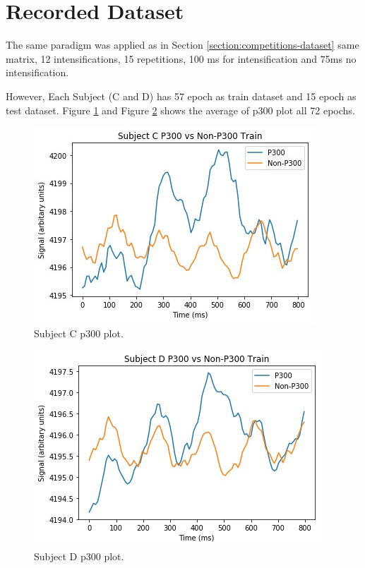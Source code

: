\section{Recorded Dataset}
The same paradigm was applied as in Section \ref{section:competitions-dataset} same matrix, 12 intensifications, 15 repetitions, 100 ms for intensification and 75ms no intensification.\par
However, Each Subject (C and D) has 57 epoch as train dataset and 15 epoch as test dataset. Figure \ref{fig:subject-C-p300} and Figure \ref{fig:subject-D-p300} shows the average of \ac{p300} plot all 72 epochs.\par
\begin{figure}[!ht]
    \centering
    \includegraphics[width=\figureWidth]{images/results/subject_C_p300.jpg}
    \caption{Subject C \ac{p300} plot.}
    \label{fig:subject-C-p300}
\end{figure}
\begin{figure}[!ht]
    \centering
    \includegraphics[width=\figureWidth]{images/results/subject_D_p300.jpg}
    \caption{Subject D \ac{p300} plot.}
    \label{fig:subject-D-p300}
\end{figure}
\clearpage

